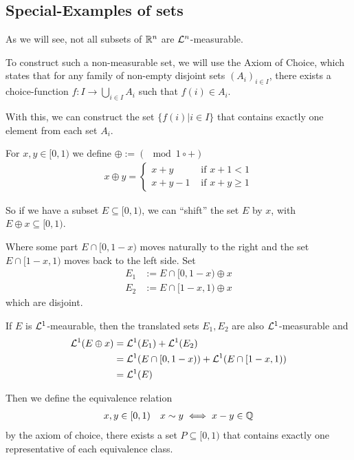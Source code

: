 \subsection{Special-Examples of sets}

As we will see, not all subsets of $\mathbb{R}^{n}$ are $\mathcal{L}^{n}$-measurable.

To construct such a non-measurable set, we will use the Axiom of Choice, which states that for any family of non-empty disjoint sets $(A_i)_{i \in I}$, there exists a choice-function $f: I \to \bigcup_{i \in I} A_i$ such that $f(i) \in A_i$.

With this, we can construct the set $\{f(i) \big\vert i \in I\}$ that contains exactly one element from each set $A_i$.

For $x,y \in [0,1)$ we define $\oplus := (\mod 1 \circ +)$
\begin{align*}
  x \oplus y = \left\{\begin{array}{ll}
    x+y & \text{ if } x + 1 < 1\\
    x + y - 1 & \text{ if } x + y \geq 1
  \end{array} \right.
\end{align*}


So if we have a subset $E \subseteq [0,1)$, we can ``shift'' the set $E$ by $x$, with $E \oplus x \subseteq [0,1)$.

Where some part $E \cap  [0,1-x)$ moves naturally to the right and the set $E \cap [1-x,1)$ moves back to the left side. 
Set
\begin{align*}
  E_1 &:= E \cap [0,1-x) \oplus x\\
  E_2 &:= E \cap [1-x,1) \oplus x
\end{align*}
which are disjoint.

If $E$ is $\mathcal{L}^{1}$-meaurable, then the translated sets $E_1,E_2$ are also $\mathcal{L}^{1}$-measurable and 
\begin{align*}
  \mathcal{L}^{1}(E \oplus x) 
  &= \mathcal{L}^{1}(E_1) + \mathcal{L}^{1}(E_2)\\
  &= \mathcal{L}^{1}(E \cap [0,1-x)) + \mathcal{L}^{1}(E \cap [1-x,1))\\
  &= \mathcal{L}^{1}(E)
\end{align*}

Then we define the equivalence relation
\begin{align*}
  x,y \in [0,1) \quad x \sim y \iff x-y \in \mathbb{Q}
\end{align*}
by the axiom of choice, there exists a set $P \subseteq [0,1)$ that contains exactly one representative of each equivalence class.

